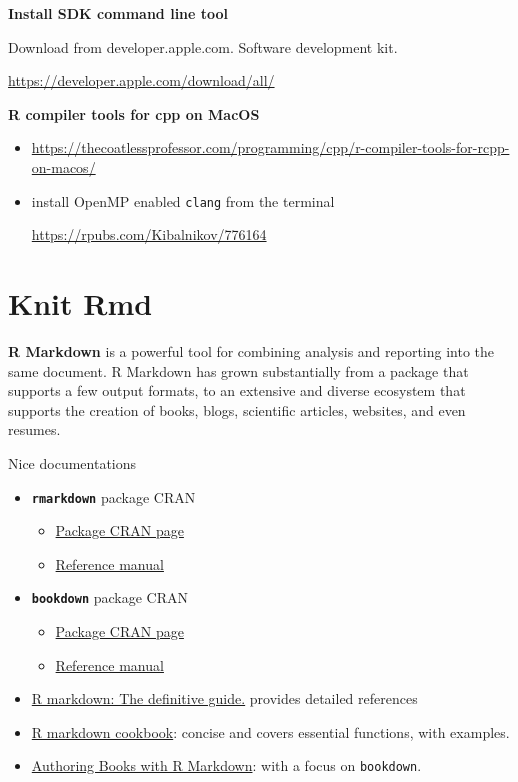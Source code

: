 \documentclass[
  a4paper,
  twoside,
  openright]{book}
\providecommand{\tightlist}{%
  \setlength{\itemsep}{0pt}\setlength{\parskip}{0pt}}
\theoremstyle{definition}
\theoremstyle{definition}
\theoremstyle{definition}
\theoremstyle{definition}
\theoremstyle{remark}
\begin{document}
\textbf{Install SDK command line tool}

Download from developer.apple.com. Software development kit.

\url{https://developer.apple.com/download/all/}

\textbf{R compiler tools for cpp on MacOS}

\begin{itemize}
\item
  \url{https://thecoatlessprofessor.com/programming/cpp/r-compiler-tools-for-rcpp-on-macos/}
\item
  install OpenMP enabled \texttt{clang} from the terminal

  \url{https://rpubs.com/Kibalnikov/776164}
\end{itemize}

\chapter{Knit Rmd}\label{knit-rmd}

\textbf{R Markdown} is a powerful tool for combining analysis and reporting into the same document. R Markdown has grown substantially from a package that supports a few output formats, to an extensive and diverse ecosystem that supports the creation of books, blogs, scientific articles, websites, and even resumes.

Nice documentations

\begin{itemize}
\tightlist
\item
  \textbf{\texttt{rmarkdown}} package CRAN

  \begin{itemize}
  \tightlist
  \item
    \href{https://cran.r-project.org/web/packages/rmarkdown/index.html}{Package CRAN page}
  \item
    \href{https://cran.r-project.org/web/packages/rmarkdown/rmarkdown.pdf}{Reference manual}
  \end{itemize}
\item
  \textbf{\texttt{bookdown}} package CRAN

  \begin{itemize}
  \tightlist
  \item
    \href{https://cran.r-project.org/web/packages/bookdown/index.html}{Package CRAN page}
  \item
    \href{https://cran.r-project.org/web/packages/bookdown/bookdown.pdf}{Reference manual}
  \end{itemize}
\item
  \href{https://bookdown.org/yihui/rmarkdown}{R markdown: The definitive guide.} provides detailed references
\item
  \href{https://bookdown.org/yihui/rmarkdown-cookbook/}{R markdown cookbook}: concise and covers essential functions, with examples.
\item
  \href{https://bookdown.org/yihui/bookdown/}{Authoring Books with R Markdown}: with a focus on \texttt{bookdown}.
\end{itemize}
\end{document}
